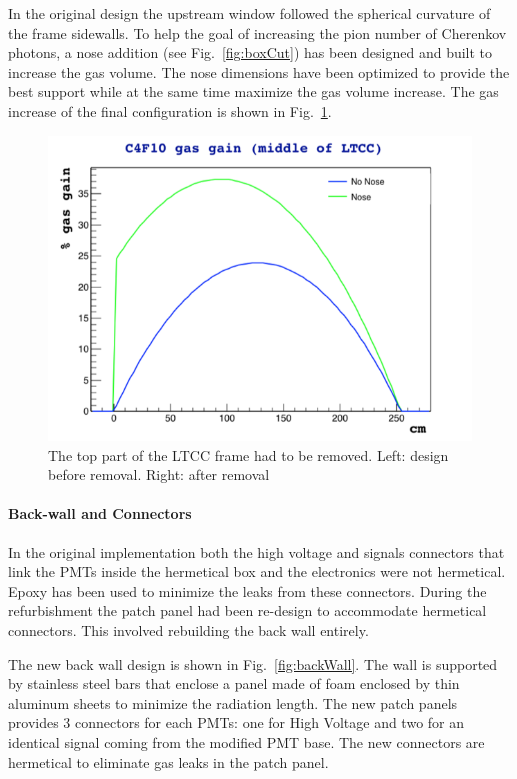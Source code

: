 In the original design the upstream window followed the spherical curvature of the frame sidewalls. To help the goal of increasing
the pion number of Cherenkov photons, a nose addition (see Fig.~\ref{fig:boxCut}) has been designed and built to increase the gas volume.
The nose dimensions have been optimized to provide the best support while at the same time maximize the gas volume increase. The gas increase
of the final configuration is shown in Fig.~\ref{fig:noseVolume}.

\begin{figure}[hbt]
	\centering
	\includegraphics[width=1.0\columnwidth,keepaspectratio]{img/noseVolume.png}
	\caption{The top part of the LTCC frame had to be removed. Left: design before removal. Right: after removal}
	\label{fig:noseVolume}
\end{figure}


\paragraph{Back-wall and Connectors}
In the original implementation both the high voltage and signals connectors that link the PMTs inside the hermetical box and the electronics were not
hermetical. Epoxy has been used to minimize the leaks from these connectors.
During the refurbishment the patch panel had been re-design to accommodate hermetical connectors. This involved rebuilding the back wall entirely.

The new back wall design is shown in Fig.~\ref{fig:backWall}. The wall is supported by stainless steel bars that enclose a panel made of foam enclosed by
thin aluminum sheets to minimize the radiation length.
The new patch panels provides 3 connectors for each PMTs: one for High Voltage and two for an identical signal coming from the modified PMT base.
The new connectors are hermetical to eliminate gas leaks in the patch panel.

